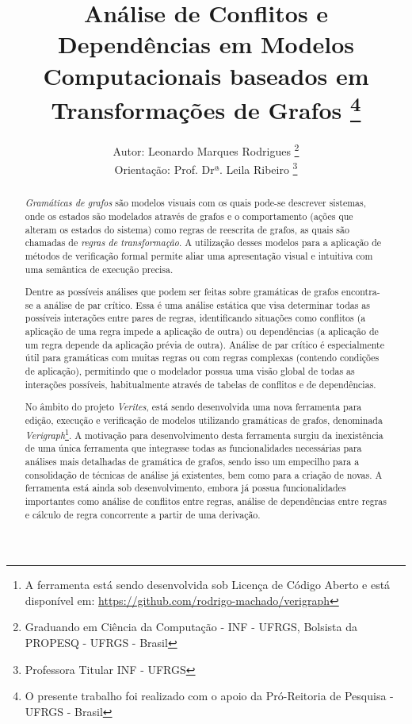 \documentclass[a4paper,11pt]{article}
\title{Análise de Conflitos e Dependências em Modelos Computacionais baseados em Transformações de Grafos \footnote{O presente trabalho foi realizado com o apoio da Pró-Reitoria de Pesquisa - UFRGS - Brasil}}
\author{Autor: Leonardo Marques Rodrigues 
		\footnote{Graduando em Ciência da Computação - INF - UFRGS, Bolsista da PROPESQ - UFRGS - Brasil} \\ 
		Orientação: Prof. Drª. Leila Ribeiro 
        \footnote{Professora Titular INF - UFRGS}}
\begin{document}
%
%
\makeatletter \renewcommand\@maketitle{%
	\begin{center}
    	\normalsize
		\let\footnote\thanks 
		{\normalsize \@title \par }
		{\normalsize \@author \par }
		\end{center} 
} \makeatother
%
%
%
%
\maketitle
%
\begin{abstract}

\normalsize \emph{Gramáticas de grafos} são modelos visuais com os quais pode-se descrever sistemas, onde os estados são modelados através de grafos e o comportamento (ações que alteram os estados do sistema) como regras de reescrita de grafos, as quais são chamadas de \emph{regras de transformação}. A utilização desses modelos para a aplicação de métodos de verificação formal permite aliar uma apresentação visual e intuitiva com uma semântica de execução precisa.

\vskip 5pt Dentre as possíveis análises que podem ser feitas sobre gramáticas de grafos encontra-se a análise de par crítico. Essa é uma análise estática que visa determinar todas as possíveis interações entre pares de regras, identificando situações como conflitos (a aplicação de uma regra impede a aplicação de outra) ou dependências (a aplicação de um regra depende da aplicação prévia de outra). Análise de par crítico é especialmente útil para gramáticas com muitas regras ou com regras complexas (contendo condições de aplicação), permitindo que o modelador possua uma visão global de todas as interações possíveis, habitualmente através de tabelas de conflitos e de dependências.

\vskip 5pt No âmbito do projeto \emph{Verites}, está sendo desenvolvida uma nova ferramenta para edição, execução e verificação de modelos utilizando gramáticas de grafos, denominada \emph{Verigraph}\footnote{A ferramenta está sendo desenvolvida sob Licença de Código Aberto e está disponível em: \url{https://github.com/rodrigo-machado/verigraph}}. A motivação para desenvolvimento desta ferramenta surgiu da inexistência de uma única ferramenta que integrasse todas as funcionalidades necessárias para análises mais detalhadas de gramática de grafos, sendo isso um empecilho para a consolidação de técnicas de análise já existentes, bem como para a criação de novas. A ferramenta está ainda sob desenvolvimento, embora já possua funcionalidades importantes como análise de conflitos entre regras, análise de dependências entre regras e cálculo de regra concorrente a partir de uma derivação.


\end{abstract}
\end{document}
